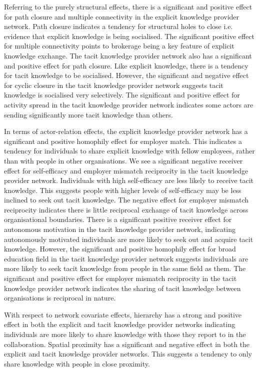 Referring to the purely structural effects, there is a significant and positive effect for path closure and multiple connectivity in the explicit knowledge provider network. Path closure indicates a tendency for structural holes to close i.e. evidence that explicit knowledge is being socialised. The significant positive effect for multiple connectivity points to brokerage being a key feature of explicit knowledge exchange. The tacit knowledge provider network also has a significant and positive effect for path closure. Like explicit knowledge, there is a tendency for tacit knowledge to be socialised. However, the significant and negative effect for cyclic closure in the tacit knowledge provider network suggests tacit knowledge is socialised very selectively. The significant and positive effect for activity spread in the tacit knowledge provider network indicates some actors are sending significantly more tacit knowledge than others.\medskip

In terms of actor-relation effects, the explicit knowledge provider network has a significant and positive homophily effect for employer match. This indicates a tendency for individuals to share explicit knowledge with fellow employees, rather than with people in other organisations. We see a significant negative receiver effect for self-efficacy and employer mismatch reciprocity in the tacit knowledge provider network. Individuals with high self-efficacy are less likely to receive tacit knowledge. This suggests people with higher levels of self-efficacy may be less inclined to seek out tacit knowledge. The negative effect for employer mismatch reciprocity indicates there is little reciprocal exchange of tacit knowledge across organisational boundaries. There is a significant positive receiver effect for autonomous motivation in the tacit knowledge provider network, indicating autonomously motivated individuals are more likely to seek out and acquire tacit knowledge. However, the significant and positive homophily effect for broad education field in the tacit knowledge provider network suggests individuals are more likely to seek tacit knowledge from people in the same field as them. The significant and positive effect for employer mismatch reciprocity in the tacit knowledge provider network indicates the sharing of tacit knowledge between organisations is reciprocal in nature. \medskip

With respect to network covariate effects, hierarchy has a strong and positive effect in both the explicit and tacit knowledge provider networks indicating individuals are more likely to share knowledge with those they report to in the collaboration. Spatial proximity has a significant and negative effect in both the explicit and tacit knowledge provider networks. This suggests a tendency to only share knowledge with people in close proximity.\medskip

